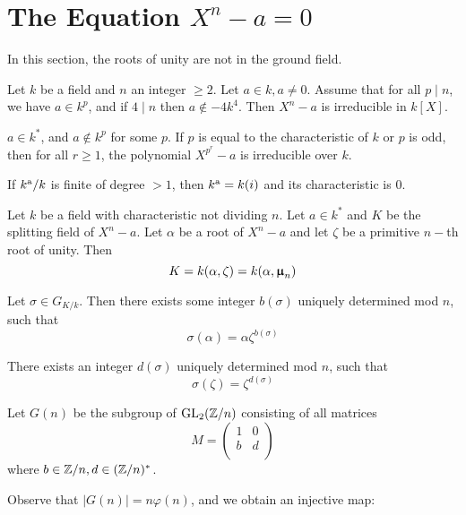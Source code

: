 \newpage\section{The Equation $X^n-a=0$}
  In this section, the roots of unity are not in the ground field.

  \begin{thm}
    Let $k$ be a field and $n$ an integer $\geqslant2$. Let $a\in k,a\neq0$. Assume that for all $p\mid n$, we have $a\in k^{p}$, and if $4\mid n$ then $a\notin-4k^4$. Then $X^n-a$ is irreducible in $k[X]$.
  \end{thm}

  \begin{cor}
    $a\in k^{\ast}$, and $a\notin k^p$ for some $p$. If $p$ is equal to the characteristic of $k$ or $p$ is odd, then for all $r\geqslant1$, the polynomial $X^{p^r}-a$ is irreducible over $k$.
  \end{cor}

  \begin{cor}
    If $k^{\operatorname{a}}/k$ is finite of degree $>1$, then $k^{\operatorname{a}}=k(i)$ and its characteristic is $0$.
  \end{cor}
  
  \begin{exam}
    Let $k$ be a field with characteristic not dividing $n$. Let $a\in k^{\ast}$ and $K$ be the splitting field of $X^n-a$. Let $\alpha$ be a root of $X^n-a$ and let $\zeta$ be a primitive $n-$th root of unity. Then
    \begin{equation*}
      K=k(\alpha,\zeta)=k(\alpha,\bm{\upmu}_n)
    \end{equation*}
    
    Let $\sigma\in G_{K/k}$. Then there exists some integer $b(\sigma)$ uniquely determined mod $n$, such that
    \begin{equation*}
      \sigma(\alpha)=\alpha\zeta^{b(\sigma)}
    \end{equation*}
    
    There exists an integer $d(\sigma)$ uniquely determined mod $n$, such that
    \begin{equation*}
      \sigma(\zeta)=\zeta^{d(\sigma)}
    \end{equation*}
    
    Let $G(n)$ be the subgroup of $\operatorname{GL}_2({\mathbb Z}/n)$ consisting of all matrices 
    \begin{equation*}
      M=\begin{pmatrix}
          1 & 0 \\
          b & d \\
        \end{pmatrix}
    \end{equation*}
    where $b\in{\mathbb Z}/n,d\in({\mathbb Z}/n)^{\ast}$.
    
    Observe that $|G(n)|=n\varphi(n)$, and we obtain an injective map:
  \end{exam}
  

